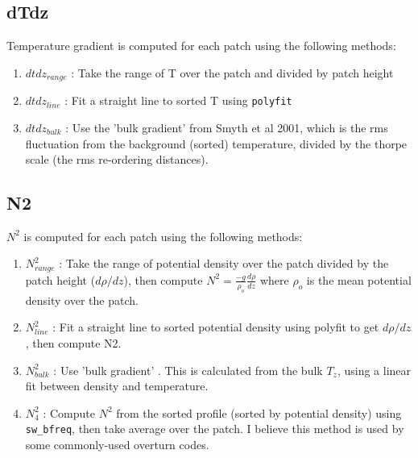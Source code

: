 \documentclass[11pt]{article}
\begin{document}
\medskip


\subsection{dTdz}

Temperature gradient is computed for each patch using the following methods:
\begin{enumerate}
\item $dtdz_{range}$ : Take the range of T over the patch and divided by patch height
\item $dtdz_{line}$ : Fit a straight line to sorted T using \verb+polyfit+
\item $dtdz_{bulk}$ : Use the 'bulk gradient' from Smyth et al 2001, which is the rms fluctuation from the background (sorted) temperature, divided by the thorpe scale (the rms re-ordering distances).
\end{enumerate}


\subsection{N2}

$N^2$ is computed for each patch using the following methods:
\begin{enumerate}
\item $N^2_{range}$ : Take the range of potential density over the patch divided by the patch height ($d\rho/dz$), then compute $N^2=\frac{-g}{\rho_o}\frac{d\rho}{dz}$ where $\rho_o$ is the mean potential density over the patch.
\item $N^2_{line}$ : Fit a straight line to sorted potential density using polyfit to get $d\rho/dz$, then compute N2.
\item $N^2_{bulk}$ : Use 'bulk gradient' . This is calculated from the bulk $T_z$, using a linear fit between density and temperature.
\item $N^2_4$ : Compute $N^2$ from the sorted profile (sorted by potential density) using \verb+sw_bfreq+, then take average over the patch. I believe this method is used by some commonly-used overturn codes.
\end{enumerate}
\end{document}
